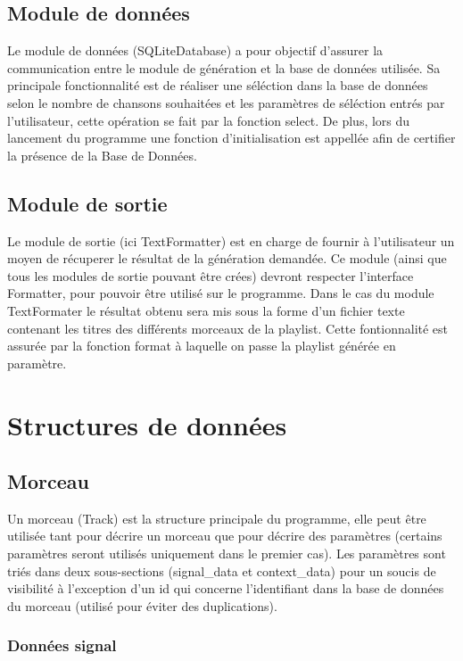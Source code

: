 \subsection{Module de données}

Le module de données (SQLiteDatabase) a pour objectif d'assurer la communication 
entre le module de génération et la base de données utilisée. Sa principale 
fonctionnalité est de réaliser une séléction dans la base de données selon le 
nombre de chansons souhaitées et les paramètres de séléction entrés par 
l'utilisateur, cette opération se fait par la fonction select.
De plus, lors du lancement du programme une fonction d'initialisation est 
appellée afin de certifier la présence de la Base de Données.

\subsection{Module de sortie}

Le module de sortie (ici TextFormatter) est en charge de fournir à 
l'utilisateur un moyen de récuperer le résultat de la génération demandée. Ce 
module (ainsi que tous les modules de sortie pouvant être crées) devront 
respecter l'interface Formatter, pour pouvoir être utilisé sur le programme. 
Dans le cas du module TextFormater le résultat obtenu sera mis sous la forme 
d'un fichier texte contenant les titres des différents morceaux de la playlist. 
Cette fontionnalité est assurée par la fonction format à laquelle on passe la 
playlist générée en paramètre.

\section{Structures de données}

\subsection{Morceau}

Un morceau (Track) est la structure principale du programme, elle peut être 
utilisée tant pour décrire un morceau que pour décrire des paramètres 
(certains paramètres seront utilisés uniquement dans le premier cas). Les 
paramètres sont triés dans deux sous-sections (signal\_data et context\_data) 
pour un soucis de visibilité à l'exception d'un id qui concerne l'identifiant 
dans la base de données du morceau (utilisé pour éviter des duplications).

\subsubsection{Données signal}

